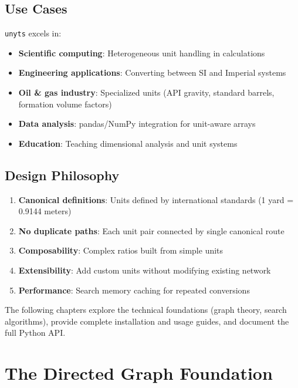 \documentclass[11pt,a4paper]{report}
\begin{document}
\section{Use Cases}

\texttt{unyts} excels in:
\begin{itemize}[leftmargin=*]
  \item \textbf{Scientific computing}: Heterogeneous unit handling in calculations
  \item \textbf{Engineering applications}: Converting between SI and Imperial systems
  \item \textbf{Oil \& gas industry}: Specialized units (API gravity, standard barrels, formation volume factors)
  \item \textbf{Data analysis}: pandas/NumPy integration for unit-aware arrays
  \item \textbf{Education}: Teaching dimensional analysis and unit systems
\end{itemize}

\section{Design Philosophy}

\begin{enumerate}[leftmargin=*]
  \item \textbf{Canonical definitions}: Units defined by international standards (1 yard = 0.9144 meters)
  \item \textbf{No duplicate paths}: Each unit pair connected by single canonical route
  \item \textbf{Composability}: Complex ratios built from simple units
  \item \textbf{Extensibility}: Add custom units without modifying existing network
  \item \textbf{Performance}: Search memory caching for repeated conversions
\end{enumerate}

The following chapters explore the technical foundations (graph theory, search algorithms), provide complete installation and usage guides, and document the full Python API.

\chapter{The Directed Graph Foundation}
\end{document}
